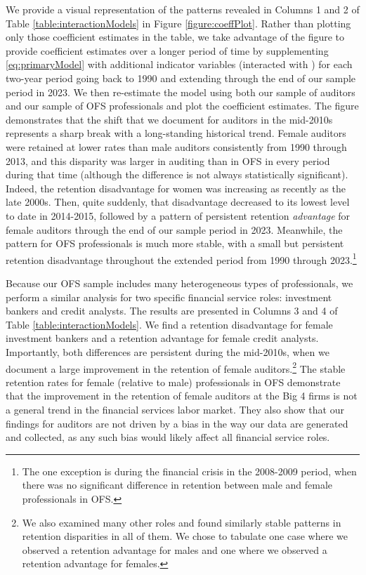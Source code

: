 \documentclass[11pt]{article}
\begin{document}
        We provide a visual representation of the patterns revealed in Columns 1 and 2 of Table \ref{table:interactionModels} in Figure \ref{figure:coeffPlot}. Rather than plotting only those coefficient estimates in the table, we take advantage of the figure to provide coefficient estimates over a longer period of time by supplementing \ref{eq:primaryModel} with additional indicator variables (interacted with \FEMALE) for each two-year period going back to 1990 and extending through the end of our sample period in 2023. We then re-estimate the model using both our sample of auditors and our sample of OFS professionals and plot the coefficient estimates. The figure demonstrates that the shift that we document for auditors in the mid-2010s represents a sharp break with a long-standing historical trend. Female auditors were retained at lower rates than male auditors consistently from 1990 through 2013, and this disparity was larger in auditing than in OFS in every period during that time (although the difference is not always statistically significant). Indeed, the retention disadvantage for women was increasing as recently as the late 2000s. Then, quite suddenly, that disadvantage decreased to its lowest level to date in 2014-2015, followed by a pattern of persistent retention \textit{advantage} for female auditors through the end of our sample period in 2023. Meanwhile, the pattern for OFS professionals is much more stable, with a small but persistent retention disadvantage throughout the extended period from 1990 through 2023.\footnote{The one exception is during the financial crisis in the 2008-2009 period, when there was no significant difference in retention between male and female professionals in OFS.}

        Because our OFS sample includes many heterogeneous types of professionals, we perform a similar analysis for two specific financial service roles: investment bankers and credit analysts. The results are presented in Columns 3 and 4 of Table \ref{table:interactionModels}. We find a retention disadvantage for female investment bankers and a retention advantage for female credit analysts. Importantly, both differences are persistent during the mid-2010s, when we document a large improvement in the retention of female auditors.\footnote{We also examined many other roles and found similarly stable patterns in retention disparities in all of them. We chose to tabulate one case where we observed a retention advantage for males and one where we observed a retention advantage for females.} The stable retention rates for female (relative to male) professionals in OFS demonstrate that the improvement in the retention of female auditors at the Big 4 firms is not a general trend in the financial services labor market. They also show that our findings for auditors are not driven by a bias in the way our data are generated and collected, as any such bias would likely affect all financial service roles. 
\end{document}
